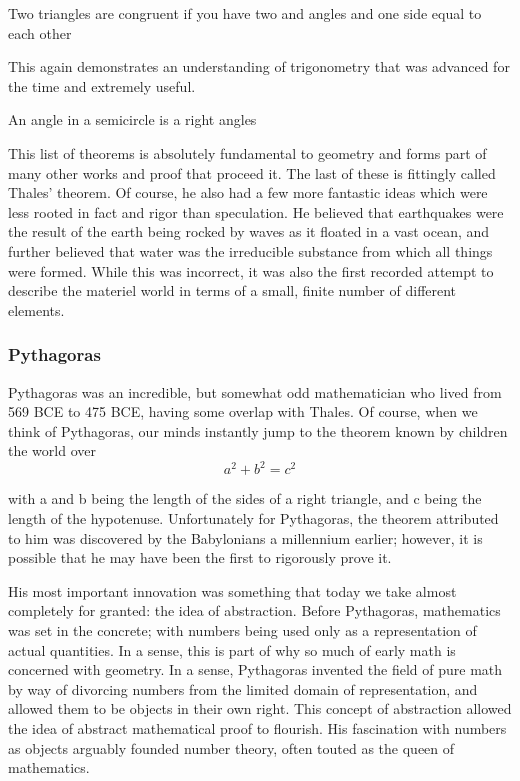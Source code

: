 \begin{theorem}
Two triangles are congruent if you have two and angles and one side equal to each other
\end{theorem}

This again demonstrates an understanding of trigonometry that was advanced for the time and extremely useful.

\begin{theorem}
An angle in a semicircle is a right angles
\end{theorem}

This list of theorems is absolutely fundamental to geometry and forms part of many other works
and proof that proceed it.
The last of these is fittingly called Thales’ theorem. Of course, he also
had a few more fantastic ideas which were less rooted in fact and rigor than speculation. He believed that
earthquakes were the result of the earth being rocked by waves as it floated in a vast ocean, and further believed that water was the
irreducible
substance from which all things were formed. While
this was incorrect, it was also the first recorded attempt to describe the materiel world in terms of
a small, finite number of different elements.

\subsubsection{Pythagoras}
Pythagoras
was an incredible, but somewhat
odd mathematician who lived from 569 BCE
to 475 BCE, having some overlap with Thales.
Of course, when we think of Pythagoras, our minds
instantly jump to the theorem known by children the world over $$a^2 + b^2 = c^2$$

with a and b being
the length of the sides
of a right triangle, and c being the length of the hypotenuse. Unfortunately
for Pythagoras, the theorem attributed to him was discovered by the Babylonians a millennium
earlier; however, it is possible that he may have been the first to rigorously prove
it. \newline

His most important innovation was something that today we take almost completely for granted: the
idea of abstraction. Before Pythagoras, mathematics was set in the concrete; with numbers being
used only as a representation of actual quantities. In a sense, this is part of why so much of early
math is concerned
with geometry. In a sense, Pythagoras invented the field of pure math by way
of divorcing numbers from the limited domain of representation, and allowed them to be objects
in their own right. This concept of abstraction allowed the idea of abstract mathematical proof to flourish. His fascination with numbers as objects arguably founded number theory, often touted as the queen of mathematics.\newline


